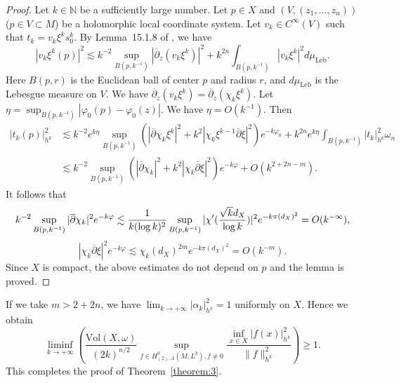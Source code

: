 \documentclass[12pt,oneside]{amsart}
\theoremstyle{plain}
\theoremstyle{definition}
\theoremstyle{remark}
\begin{document}
\begin{proof}
Let $k \in \mathbb{N}$ be a sufficiently large number.  
Let $p \in X$ and 
$(V, (z_{1}, \ldots, z_{n}))$ ($p \in V \subset M$) be a holomorphic local coordinate system.  
Let $v_{k} \in C^{\infty}(V)$ such that $t_{k} = v_{k} \xi^k s^k_{0}$.  
By Lemma~15.1.8 of \cite{Hor},  
we have 
\[
|v_{k}\xi^k(p)|^2 \lesssim k^{-2} \sup_{B(p, k^{-1})} |\overline{\partial}_{z}(v_{k}\xi^k)|^2 + k^{2n} \int_{B(p, k^{-1})} |v_{k}\xi^k|^2 d\mu_{\mathrm{Leb}}.  
\]
Here $B(p, r)$ is the Euclidean ball of center $p$ and radius $r$, and $d\mu_{\mathrm{Leb}}$ is the Lebesgue measure on $V$.  
We have $\overline{\partial}_{z} (v_{k}\xi^k) = \overline{\partial}_{z} (\chi_{k}\xi^k)$.  
Let $\eta = \sup_{B(p, k^{-1})} |\varphi_{0}(p)-\varphi_{0}(z)|$.  
We have $\eta = O(k^{-1})$.  
Then 
\begin{align*}
|t_{k}(p)|^2_{h^k} & \lesssim k^{-2} e^{k\eta} \sup_{B(p, k^{-1})} (|\overline{\partial}\chi_{k} \xi^k|^2 + k^2|\chi_{k}\xi^{k-1}\overline{\partial}\xi|^2)e^{-k\varphi_{0}} + k^{2n}e^{k\eta} \int_{B(p, k^{-1})} |t_{k}|^2_{h^k} \omega_n \\
& \lesssim
k^{-2}  \sup_{B(p, k^{-1})} (|\overline{\partial}\chi_{k}|^2 + k^2|\chi_{k}\overline{\partial}\xi|^2)e^{-k\varphi} +  O(k^{2+2n-m}).   
\end{align*}
It follows that 
\[
k^{-2} \sup_{B(p,k^{-1})} |\overline{\partial} \chi_{k}|^2e^{-k\varphi} \lesssim \frac{1}{k(\log k)^2} \sup_{B(p, k^{-1})} \large|\chi'(\frac{\sqrt{k}d_{X}}{\log k})\large|^2 e^{-k\pi (d_{X})^2} 
= O(k^{-\infty}), 
\]
\[
|\chi_{k}\overline{\partial}\xi|^2 e^{-k\varphi} \lesssim \chi_{k} (d_{X})^{2m}e^{-k\pi (d_{X})^2} = O(k^{-m}).  
\]
Since $X$ is compact, the above estimates do not depend on $p$ and the lemma is proved.  
\end{proof}

If we take $m > 2 + 2n$, we have $\lim_{k \to +\infty}|\alpha_{k}|^2_{h^k} = 1$ uniformly on $X$.  
Hence we obtain 
\[
\liminf_{k \to +\infty} \left(\frac{\mathrm{Vol}(X, \omega)}{(2k)^{n/2}} \sup_{f \in H^0_{(2), A}(M, L^k), f \neq 0}\frac{\inf_{x \in X} |f(x)|^2_{h^k}}{\|f\|^2_{h^k}}\right) \geq 1.  
\]
This completes the proof of Theorem~\ref{theorem:3}.  
\end{document}
